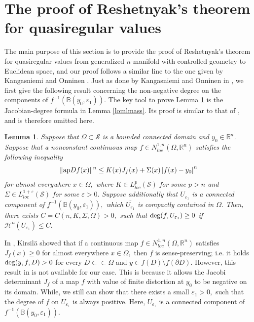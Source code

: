 \documentclass[11pt,twoside]{article}
\newtheorem{lem}[thm]{Lemma}
\theoremstyle{definition}
\theoremstyle{remark}
\newcommand{\abs}[1]{\left|#1\right|}
\begin{document}
\section{The proof of Reshetnyak's theorem for quasiregular values}\label{schjcsjb}
The main purpose of this section is to provide the proof of Reshetnyak's theorem for quasiregular values from generalized $n$-manifold with controlled geometry to Euclidean space, and our proof follows a similar line to the one given by Kangasniemi and  Onninen \cite{KO222}. Just as done by Kangasniemi and  Onninen in \cite[Lemma 5.2]{KO222}, we first give the following result concerning the non-negative degree on the components of $f^{-1}(\mathbb{B}(y_{0},\varepsilon_{1})).$  The key tool to prove Lemma \ref{ahkkdjk} is the Jacobian-degree formula in Lemma \ref{lomlmass}. Its proof is similar to that of \cite[Lemma 5.2]{KO222}, and is therefore omitted here.
\begin{lem}\label{ahkkdjk}
Suppose that $\Omega\subset\mathcal{S}$ is a bounded connected domain and $y_{0}\in\mathbb{R}^{n}$. Suppose that a nonconstant continuous map $f\in N_{loc}^{1,n}(\Omega,\mathbb{R}^{n})$ 
 satisfies the following inequality
\begin{equation}
\| {\rm ap}Df(x)\|^{n}\leq K(x)J_{f}(x)+\Sigma(x)\abs{f(x)-y_{0}}^{n}
\end{equation}
for almost everywhere $x\in\Omega,$ where $K\in L_{loc}^{p}(\mathcal{S})$ for some $p>n$ and  $\Sigma\in L_{loc}^{1+\varepsilon}(\mathcal{S})$ for some $\varepsilon>0.$   Suppose additionally that $U_{\varepsilon_{1}}$ is a connected component of $f^{-1}(\mathbb{B}(y_{0},\varepsilon_{1})),$ which $\overline{U_{\varepsilon_{1}}}$ is compactly contained in $\Omega.$ Then, there exists $C=C(n,K,\Sigma,\Omega)>0,$ such that 
${\rm deg}(f,U_{\varepsilon_{1}})\geq0$ if $\mathcal{H}^{n}(U_{\varepsilon_{1}})\leq C.$
\end{lem}
In \cite[Theorem 5.3]{Kir16}, Kirsil\"{a} showed that if a continuous map $f\in N_{loc}^{1,n}(\Omega,\mathbb{R}^{n})$ satisfies $J_{f}(x)\geq0$ for almost everywhere $x\in\Omega,$ then $f$ is sense-preserving; i.e. it holds  ${\rm deg}(y, f,D)>0$ for every $D\subset\subset\Omega$ and $y\in f(D)\setminus f(\partial D).$ However, this result in \cite[Theorem 5.3]{Kir16} is not available for our case.
This is because it allows the Jacobi determinant $J_{f}$ of a map $f$ with value of finite distortion at $y_{0}$ to be negative on its domain.  While, we still can show that there exists a small 
$\varepsilon_{1}>0,$ such that the degree of $f$ on $U_{\varepsilon_{1}}$ is always positive. Here,  $U_{\varepsilon_{1}}$ is a connected component of $f^{-1}(\mathbb{B}(y_{0},\varepsilon_{1})).$ 
\end{document}
